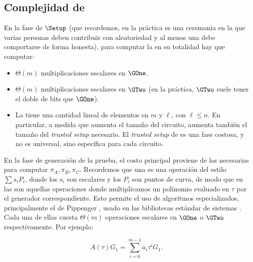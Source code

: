\subsection{Complejidad de \Groth}

En la fase de $\Setup$ (que recordemos, en la práctica es una ceremonia en la que varias personas deben contribuir con aleatoriedad y al menos una debe comportarse de forma honesta), para computar la \SRS en su totalidad hay que computar:
\begin{itemize}[noitemsep]
	\item $\Theta(m)$ multiplicaciones escalares en $\GOne$.
	\item $\Theta(m)$ multiplicaciones escalares en $\GTwo$ (en la práctica, $\GTwo$ suele tener el doble de bits que $\GOne$).
	\item La \SRS tiene una cantidad lineal de elementos en $m$ y $\ell$, con $\ell \leq n$. En particular, a medida que aumenta el tamaño del circuito, aumenta también el tamaño del \textit{trusted setup} necesario. El \textit{trusted setup} de \Groth es una fase costosa, y no es universal, sino específica para cada circuito.
\end{itemize}

En la fase de generación de la prueba, el costo principal proviene de las \MSM necesarias para computar $\pi_A, \pi_B, \pi_C$. Recordemos que una \MSM es una operación del estilo $\sum s_i P_i$, donde los $s_i$ son escalares y los $P_i$ son puntos de curva, de modo que en \Groth las \MSM son aquellas operaciones donde multiplicamos un polinomio evaluado en $\tau$ por el generador correspondiente. Esto permite el uso de algoritmos especializados, principalmente el de Pippenger \cite{Pippenger1976}, usado en las bibliotecas estándar de sistemas \zkSNARK \cite{gnark, arkworks, bellman}. Cada una de ellas cuesta $\Theta(m)$ operaciones escalares en $\GOne$ o $\GTwo$ respectivamente. Por ejemplo:

$$A(\tau) G_1 = \sum_{i=0}^{m - 1} a_i \tau^i G_1.$$


